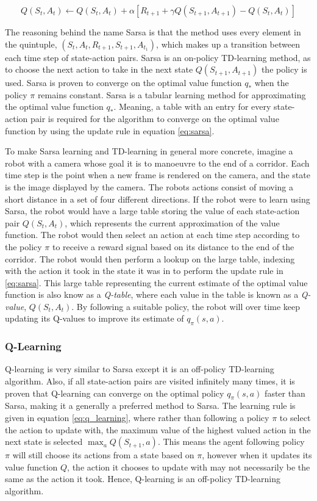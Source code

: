 \documentclass[../dissertation.tex]{subfiles}
\begin{document}
\begin{equation}
Q(S_t, A_t) \leftarrow Q(S_t, A_t) + \alpha[R_{t+1} + \gamma Q(S_{t+1}, A_{t+1}) - Q(S_t, A_t)]
\label{eq:sarsa}
\end{equation}

The reasoning behind the name Sarsa is that the method uses every element in the quintuple, $(S_t, A_t, R_{t+1}, S_{t+1}, A_{t_1})$, which makes up a transition between each time step of state-action pairs. Sarsa is an on-policy TD-learning method, as to choose the next action to take in the next state $Q(S_{t+1}, A_{t+1})$ the policy is used. Sarsa is proven to converge on the optimal value function $q_*$ when the policy $\pi$ remains constant. Sarsa is a tabular learning method for approximating the optimal value function $q_*$. Meaning, a table with an entry for every state-action pair is required for the algorithm to converge on the optimal value function by using the update rule in equation \ref{eq:sarsa}.

To make Sarsa learning and TD-learning in general more concrete, imagine a robot with a camera whose goal it is to manoeuvre to the end of a corridor. Each time step is the point when a new frame is rendered on the camera, and the state is the image displayed by the camera. The robots actions consist of moving a short distance in a set of four different directions. If the robot were to learn using Sarsa, the robot would have a large table storing the value of each state-action pair $Q(S_t, A_t)$, which represents the current approximation of the value function. The robot would then select an action at each time step according to the policy $\pi$ to receive a reward signal based on its distance to the end of the corridor. The robot would then perform a lookup on the large table, indexing with the action it took in the state it was in to perform the update rule in \ref{eq:sarsa}. This large table representing the current estimate of the optimal value function is also know as a \textit{Q-table}, where each value in the table is known as a \textit{Q-value}, $Q(S_t, A_t)$. By following a suitable policy, the robot will over time keep updating its Q-values to improve
its estimate of $q_\pi(s,a)$.

\subsubsection{Q-Learning}

Q-learning is very similar to Sarsa except it is an off-policy TD-learning algorithm. Also, if all state-action pairs are visited infinitely many times, it is proven that Q-learning can converge on the optimal policy $q_\pi(s,a)$ faster than Sarsa, making it a generally a preferred method to Sarsa. The learning rule is given in equation \ref{eq:q_learning}, where rather than following a policy $\pi$ to select the action to update with, the maximum value of the highest valued action in the next state is selected $\max_a Q(S_{t+1}, a)$. This means the agent following policy $\pi$ will still choose its actions from a state based on $\pi$, however when it updates its value function $Q$, the action it chooses to update with may not necessarily be the same as the action it took. Hence, Q-learning is an off-policy TD-learning algorithm.
\end{document}
